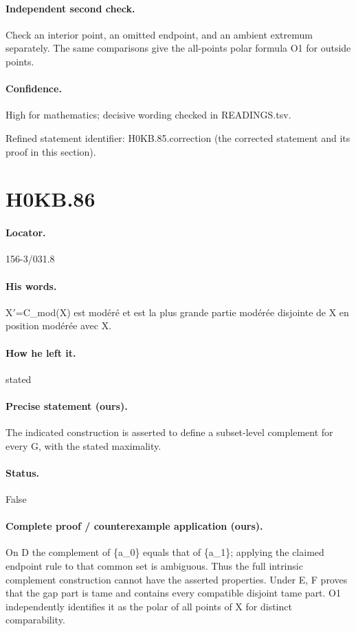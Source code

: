 \paragraph{Independent second check.} Check an interior point, an omitted endpoint, and an ambient extremum separately. The same comparisons give the all-points polar formula O1 for outside points.

\paragraph{Confidence.} High for mathematics; decisive wording checked in READINGS.tsv.

\noindent Refined statement identifier: H0KB.85.correction (the corrected statement and its proof in this section).

\section*{H0KB.86}\label{statement:H0KB.86}
\paragraph{Locator.} 156-3/031.8

\paragraph{His words.} X\ensuremath{\prime}=C\_mod(X) est modéré et est la plus grande partie modérée disjointe de X en position modérée avec X.

\paragraph{How he left it.} stated

\paragraph{Precise statement (ours).} The indicated construction is asserted to define a subset-level complement for every G, with the stated maximality.

\paragraph{Status.} False

\paragraph{Complete proof / counterexample application (ours).} On D the complement of \{a\_0\} equals that of \{a\_1\}; applying the claimed endpoint rule to that common set is ambiguous. Thus the full intrinsic complement construction cannot have the asserted properties. Under E, F proves that the gap part is tame and contains every compatible disjoint tame part. O1 independently identifies it as the polar of all points of X for distinct comparability.


